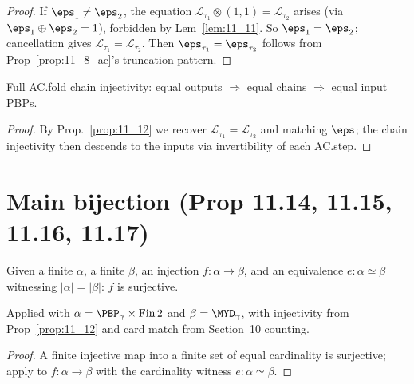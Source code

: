 \begin{proof}
  \leanok
  If $\eps_1 \neq \eps_2$, the equation $\mathcal{L}_{\tau_1} \otimes (1, 1) = \mathcal{L}_{\tau_2}$ arises (via $\eps_1 \oplus \eps_2 = 1$), forbidden by Lem~\ref{lem:11_11}. So $\eps_1 = \eps_2$; cancellation gives $\mathcal{L}_{\tau_1} = \mathcal{L}_{\tau_2}$. Then $\eps_{\tau_1} = \eps_{\tau_2}$ follows from Prop~\ref{prop:11_8_ac}'s truncation pattern.
\end{proof}

\begin{proposition}
  \label{prop:11_13}
  \leanok
  Full AC.fold chain injectivity: equal outputs $\Rightarrow$ equal chains $\Rightarrow$ equal input PBPs.
\end{proposition}
\begin{proof}
  \leanok
  By Prop.~\ref{prop:11_12} we recover $\mathcal{L}_{\tau_1} = \mathcal{L}_{\tau_2}$ and matching $\eps$; the chain injectivity then descends to the inputs via invertibility of each AC.step.
\end{proof}


\section{Main bijection (Prop 11.14, 11.15, 11.16, 11.17)}

\begin{proposition}
  \label{prop:11_14}
  \leanok
  Given a finite $\alpha$, a finite $\beta$, an injection $f : \alpha \to \beta$, and an equivalence $e : \alpha \simeq \beta$ witnessing $|\alpha| = |\beta|$:
  $f$ is surjective.

  Applied with $\alpha = \PBP_\gamma \times \mathrm{Fin}\,2$ and $\beta = \MYD_\gamma$, with injectivity from Prop~\ref{prop:11_12} and card match from Section~10 counting.
\end{proposition}
\begin{proof}
  \leanok
  A finite injective map into a finite set of equal cardinality is surjective; apply to $f : \alpha \to \beta$ with the cardinality witness $e : \alpha \simeq \beta$.
\end{proof}


